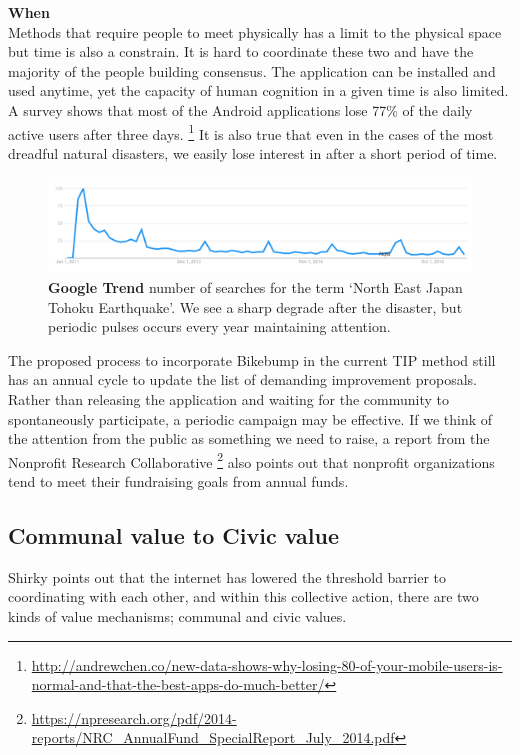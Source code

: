 \textbf{When} \\
Methods that require people to meet physically has a limit to the physical space but time is also a constrain. It is hard to coordinate these two and have the majority of the people building consensus. The application can be installed and used anytime, yet the capacity of human cognition in a given time is also limited. A survey shows that most of the Android applications lose 77\% of the daily active users after three days.
\footnote{\url{http://andrewchen.co/new-data-shows-why-losing-80-of-your-mobile-users-is-normal-and-that-the-best-apps-do-much-better/}}
It is also true that even in the cases of the most dreadful natural disasters, we easily lose interest in after a short period of time. 

\begin{figure}[!htb]
\includegraphics[width=\textwidth]{chapters/5/fig/tohoku_trend.png}
\caption[Trend for North East Japan Tohoku Earthquake]{\textbf{Google Trend} number of searches for the term `North East Japan Tohoku Earthquake'. We see a sharp degrade after the disaster, but periodic pulses occurs every year maintaining attention.}
\label{fig:tohoku_trend}
\end{figure}

The proposed process to incorporate Bikebump in the current TIP method still has an annual cycle to update the list of demanding improvement proposals. 
Rather than releasing the application and waiting for the community to spontaneously participate, a periodic campaign may be effective.
If we think of the attention from the public as something we need to raise, a report from the Nonprofit Research Collaborative
\footnote{\url{https://npresearch.org/pdf/2014-reports/NRC_AnnualFund_SpecialReport_July_2014.pdf}}
also points out that nonprofit organizations tend to meet their fundraising goals from annual funds.

\subsection{Communal value to Civic value}
Shirky points out that the internet has lowered the threshold barrier to coordinating with each other,
and within this collective action,
there are two kinds of value mechanisms; communal and civic values. \cite{shirky2010cognitive}

